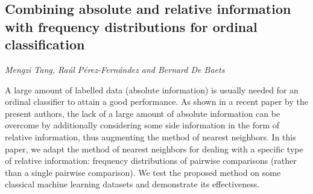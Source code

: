 \documentclass[../booklet.tex]{subfiles}
\begin{document}
\subsection[Combining absolute and relative information with frequency distributions for ordinal classification. {\it Mengzi Tang, Raúl Pérez-Fernández and Bernard De Baets}]{Combining absolute and relative information with frequency distributions for ordinal classification}
  

\begin{center}
  {\it Mengzi Tang, Raúl Pérez-Fernández and Bernard De Baets}
\end{center}

\vskip 0.8cm


A large amount of labelled data (absolute information) is usually needed for an ordinal classifier to attain a good performance. As shown in a recent paper by the present authors, the lack of a large amount of absolute information can be overcome by additionally considering some side information in the form of relative information, thus augmenting the method of nearest neighbors. In this paper, we adapt the method of nearest neighbors for dealing with a specific type of relative information: frequency distributions of pairwise comparisons (rather than a single pairwise comparison). We test the proposed method on some classical machine learning datasets and demonstrate its effectiveness.

\end{document}
